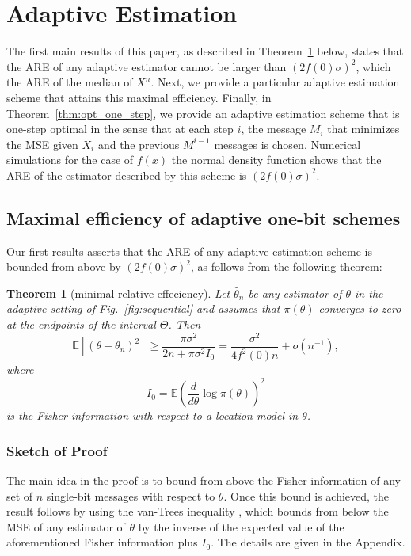 \documentclass[letterpaper, conference, 11pt]{IEEEtran}      %
\newtheorem{thm}{\bf{Theorem}}
\begin{document}
\section{Adaptive Estimation \label{sec:sequential}}
The first main results of this paper, as described in Theorem~\ref{thm:adpative_lower_bound} below, states that the ARE of any adaptive estimator cannot be larger than $(2f(0)\sigma)^2$, which the ARE of the median of $X^n$. Next, we provide a particular adaptive estimation scheme that attains this maximal efficiency. Finally, in Theorem~\ref{thm:opt_one_step}, we provide an adaptive estimation scheme that is one-step optimal in the sense that at each step $i$, the message $M_i$ that minimizes the MSE given $X_i$ and the previous $M^{i-1}$ messages is chosen. Numerical simulations for the case of $f(x)$ the normal density function shows that the ARE of the estimator described by this scheme is $(2f(0)\sigma)^2$. 

\subsection{Maximal efficiency of adaptive one-bit schemes}
Our first results asserts that the ARE of any adaptive estimation scheme is bounded from above by $(2 f(0)\sigma )^2$, as follows from the following theorem:
\begin{thm}[minimal relative effeciency] \label{thm:adpative_lower_bound}
Let $\hat{\theta}_n$ be any estimator of $\theta$ in the adaptive setting of Fig.~\ref{fig:sequential} and assumes that $\pi(\theta)$ converges to zero at the endpoints of the interval $\Theta$. Then
\[
\mathbb E\left[ (\theta-\theta_n)^2 \right] \geq  \frac{\pi \sigma^2 }{2n +\pi \sigma^2  I_0}  =  \frac{\sigma^2}{4f^2(0) n}+o(n^{-1}),
\]
where 
\[
I_0 = \mathbb E \left( \frac{d}{d\theta} \log \pi (\theta) \right)^2
\]
is the Fisher information with respect to a location model in $\theta$. 
\end{thm}

\subsubsection*{Sketch of Proof}
The main idea in the proof is to bound from above the Fisher information of any set of $n$ single-bit messages with respect to $\theta$. Once this bound is achieved, the result follows by using the van-Trees inequality \cite[Thm. 2.13]{tsybakov2008introduction},\cite{gill1995applications} which bounds from below the MSE of any estimator of $\theta$ by the inverse of the expected value of the aforementioned Fisher information plus $I_0$. The details are given in the Appendix.\\
\end{document}
